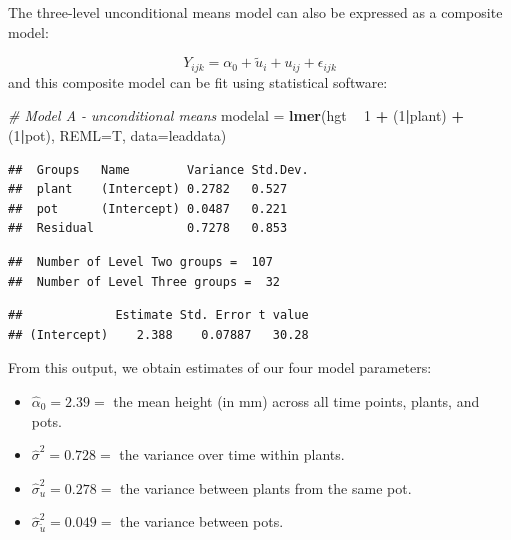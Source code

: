\documentclass[
]{krantz}
\newenvironment{Shaded}{\begin{snugshade}}{\end{snugshade}}
\newcommand{\CommentTok}[1]{\textcolor[rgb]{0.37,0.37,0.37}{\textit{#1}}}
\newcommand{\DataTypeTok}[1]{\textcolor[rgb]{0.27,0.27,0.27}{#1}}
\newcommand{\DecValTok}[1]{\textcolor[rgb]{0.06,0.06,0.06}{#1}}
\newcommand{\KeywordTok}[1]{\textcolor[rgb]{0.27,0.27,0.27}{\textbf{#1}}}
\newcommand{\NormalTok}[1]{#1}
\newcommand{\OperatorTok}[1]{\textcolor[rgb]{0.43,0.43,0.43}{\textbf{#1}}}
\newcommand{\StringTok}[1]{\textcolor[rgb]{0.5,0.5,0.5}{#1}}
\providecommand{\tightlist}{%
  \setlength{\itemsep}{0pt}\setlength{\parskip}{0pt}}
\begin{document}
The three-level unconditional means model can also be expressed as a composite model:

\begin{equation*}
Y_{ijk}=\alpha_{0}+\tilde{u}_{i}+u_{ij}+\epsilon_{ijk}
\end{equation*}
and this composite model can be fit using statistical software:

\begin{Shaded}
\begin{Highlighting}[]
\CommentTok{# Model A - unconditional means}
\NormalTok{modelal =}\StringTok{ }\KeywordTok{lmer}\NormalTok{(hgt }\OperatorTok{~}\StringTok{ }\DecValTok{1} \OperatorTok{+}\StringTok{ }\NormalTok{(}\DecValTok{1}\OperatorTok{|}\NormalTok{plant) }\OperatorTok{+}\StringTok{ }\NormalTok{(}\DecValTok{1}\OperatorTok{|}\NormalTok{pot), }
               \DataTypeTok{REML=}\NormalTok{T, }\DataTypeTok{data=}\NormalTok{leaddata)}
\end{Highlighting}
\end{Shaded}

\begin{verbatim}
##  Groups   Name        Variance Std.Dev.
##  plant    (Intercept) 0.2782   0.527   
##  pot      (Intercept) 0.0487   0.221   
##  Residual             0.7278   0.853
\end{verbatim}

\begin{verbatim}
##  Number of Level Two groups =  107 
##  Number of Level Three groups =  32
\end{verbatim}

\begin{verbatim}
##             Estimate Std. Error t value
## (Intercept)    2.388    0.07887   30.28
\end{verbatim}

From this output, we obtain estimates of our four model parameters:

\begin{itemize}
\tightlist
\item
  \(\hat{\alpha}_{0}=2.39=\) the mean height (in mm) across all time points, plants, and pots.
\item
  \(\hat{\sigma}^2=0.728=\) the variance over time within plants.
\item
  \(\hat{\sigma}_{u}^{2}=0.278=\) the variance between plants from the same pot.
\item
  \(\hat{\sigma}_{\tilde{u}}^{2}=0.049=\) the variance between pots.
\end{itemize}
\end{document}
